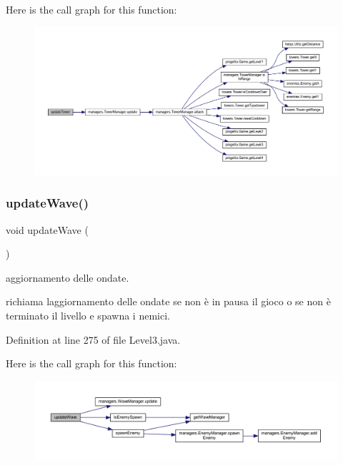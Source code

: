 Here is the call graph for this function\+:
\nopagebreak
\begin{figure}[H]
\begin{center}
\leavevmode
\includegraphics[width=350pt]{classscenes_1_1_level3_ae4fd4a959e4d782a5e7ac0eff77ba27f_cgraph}
\end{center}
\end{figure}
\mbox{\label{classscenes_1_1_level3_ab424ab29e7ab4733f2efd1e6ef3f13b1}} 
\subsubsection{\texorpdfstring{update\+Wave()}{updateWave()}}
{\footnotesize\ttfamily void update\+Wave (\begin{DoxyParamCaption}{ }\end{DoxyParamCaption})}



aggiornamento delle ondate. 

richiama l\textquotesingle{}aggiornamento delle ondate se non è in pausa il gioco o se non è terminato il livello e spawna i nemici. 

Definition at line 275 of file Level3.\+java.

Here is the call graph for this function\+:
\nopagebreak
\begin{figure}[H]
\begin{center}
\leavevmode
\includegraphics[width=350pt]{classscenes_1_1_level3_ab424ab29e7ab4733f2efd1e6ef3f13b1_cgraph}
\end{center}
\end{figure}


